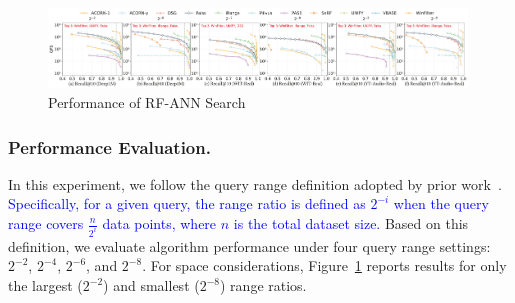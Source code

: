 \documentclass[sigconf, nonacm]{acmart}
\begin{document}
{	



		
	\begin{figure}[t]
		
		\centering
		
		\includegraphics[width=0.99\textwidth]{figures/exp/exp_8_2.pdf}
		\setlength{\abovecaptionskip}{0.1cm}
		\setlength{\belowcaptionskip}{-0.15cm}
		\caption{Performance of RF-ANN Search}
		\label{fig:exp_8_2}
	\end{figure}
	
	
	\subsubsection{Performance Evaluation. }
	
	In this experiment, we follow the query range definition adopted by prior work~\cite{HQI}. \textcolor{blue}{Specifically, for a given query, the range ratio is defined as $2^{-i}$	when the query range covers $\frac{n}{2^i}$ data points, where $n$ is the total dataset size.}
	Based on this definition, we evaluate algorithm performance under four query range settings: $2^{-2}$, $2^{-4}$, $2^{-6}$, and $2^{-8}$. For space considerations, Figure~\ref{fig:exp_8_2} reports results for only the largest ($2^{-2}$) and smallest ($2^{-8}$) range ratios. 
	
}
\end{document}
